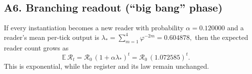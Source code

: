 \documentclass[11pt]{article}
\theoremstyle{remark}
\begin{document}
\subsection*{A6. Branching readout (``big bang'' phase)} 
If every instantiation becomes a new reader with probability $\alpha=0.120000$ and a reader's mean per-tick output is
\(
\lambda_\ast=\sum_{m=1}^4\varphi^{-2m}=0.604878,
\)
then the expected reader count grows as
\begin{equation*}
\mathbb E\,\mathcal R_t=\mathcal R_0\,(1+\alpha\lambda_\ast)^t
=\mathcal R_0\,(1.072585)^t.
\end{equation*}
This is exponential, while the register and its law remain unchanged.
\end{document}
